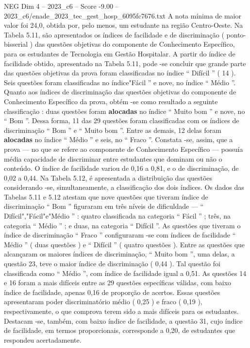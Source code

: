 \begin{textsample}{NEG Dim 4 – 2023\_c6 – Score -9.00 – 2023\_c6/enade\_2023\_tec\_gest\_hosp\_6095fc7676.txt}
A nota mínima de maior valor foi 24,0, obtida por, pelo menos, um estudante na região Centro-Oeste.
Na Tabela 5.11, são apresentados os índices de facilidade e de discriminação ( ponto-bisserial ) das questões objetivas do componente de Conhecimento Específico, para os estudantes de Tecnologia em Gestão Hospitalar.
A partir do índice de facilidade obtido, apresentado na Tabela 5.11, pode -se concluir que grande parte das questões objetivas da prova foram classificadas no índice “ Difícil ” ( 14 ).
Seis questões foram classificadas no índice"Fácil ” e nove, no índice “ Médio ”.
Quanto aos índices de discriminação das questões objetivas do componente de Conhecimento Específico da prova, obtém -se como resultado a seguinte classificação : duas questões foram \textbf{alocadas} no índice “ Muito bom ” e nove, no “ Bom ”.
Dessa forma, 11 das 29 questões foram classificadas com os índices de discriminação “ Bom ” e “ Muito bom ”.
Entre as demais, 12 delas foram \textbf{alocadas} no índice “ Médio ” e seis, no “ Fraco ”.
Constata -se, assim, que a prova — no que se refere ao componente de Conhecimento Específico — possuía média capacidade de discriminar entre estudantes que dominam ou não o conteúdo.
O índice de facilidade variou de 0,16 a 0,81, e o de discriminação, de 0,02 a 0,44.
Na Tabela 5.12, é apresentada a distribuição das questões considerando -se, simultaneamente, a classificação dos dois índices.
Os dados das Tabelas 5.11 e 5.12 atestam que nove questões que tiveram índice de discriminação “ Bom ” figuraram em três níveis de dificuldade — “ Difícil","Fácil"e"Médio ” : quatro classificada na categoria “ Fácil ” ; três, na categoria “ Médio ” ; e duas, na categoria “ Difícil ”.
As questões que tiveram o índice de discriminação “ Fraco ” configuraram -se com índices de facilidade “ Médio ” ( duas questões ) e “ Difícil ” ( quatro questões ).
Entre as questões que alcançaram os maiores índices de discriminação, “ Muito bom ”, uma delas, a questão 23, teve o maior índice de discriminação ( 0,44 ).
Tal questão foi classificada como “ Médio ”, com índice de facilidade igual a 0,51.
As questões 14 e 16 foram a mais difíceis entre as 29 questões específicas válidas, com baixo índice de facilidade, apenas 0,16 de proporção de acertos.
Essas questões apresentaram poder discriminatório médio ( 0,25 ) e fraco ( 0,19 ), respectivamente, o que comprova terem sido a mais difíceis para os estudantes.
Destacam -se, também, com baixo índice de facilidade, a questão 31, cujo índice de facilidade, em termos proporcionais, corresponde a 0,20, de estudantes que respondeu acertadamente.

\end{textsample}
